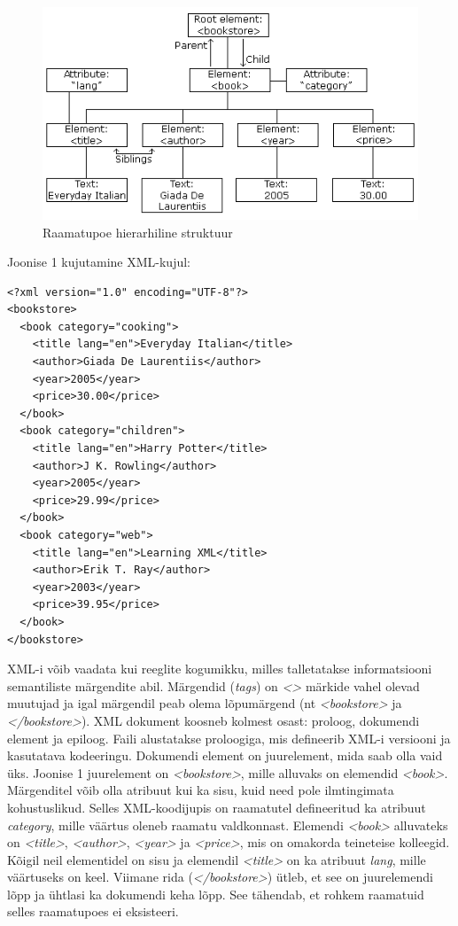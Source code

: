 \documentclass[12pt]{article}
\begin{document}
\begin{figure}[h]
\centering
\includegraphics[width=\textwidth]{figures/nodetree}
\caption{Raamatupoe hierarhiline struktuur \citep{XML}}
\end{figure}

Joonise 1 kujutamine XML-kujul:


\begin{lstlisting}
<?xml version="1.0" encoding="UTF-8"?>
<bookstore>
  <book category="cooking">
    <title lang="en">Everyday Italian</title>
    <author>Giada De Laurentiis</author>
    <year>2005</year>
    <price>30.00</price>
  </book>
  <book category="children">
    <title lang="en">Harry Potter</title>
    <author>J K. Rowling</author>
    <year>2005</year>
    <price>29.99</price>
  </book>
  <book category="web">
    <title lang="en">Learning XML</title>
    <author>Erik T. Ray</author>
    <year>2003</year>
    <price>39.95</price>
  </book>
</bookstore>
\end{lstlisting}
\citep{XML}

XML-i võib vaadata kui reeglite kogumikku, milles talletatakse informatsiooni semantiliste märgendite abil. Märgendid (\emph{tags}) on \emph{<>} märkide vahel olevad muutujad ja igal märgendil peab olema lõpumärgend (nt \emph{<bookstore>} ja \emph{</bookstore>}). XML dokument koosneb kolmest osast: proloog, dokumendi element ja epiloog. Faili alustatakse proloogiga, mis defineerib XML-i versiooni ja kasutatava kodeeringu. Dokumendi element on juurelement, mida saab olla vaid üks. Joonise 1 juurelement on \emph{<bookstore>}, mille alluvaks on elemendid \emph{<book>}. Märgenditel võib olla atribuut kui ka sisu, kuid need pole ilmtingimata kohustuslikud. Selles XML-koodijupis on raamatutel defineeritud ka atribuut \emph{category}, mille väärtus oleneb raamatu valdkonnast. Elemendi \emph{<book>} alluvateks on \emph{<title>}, \emph{<author>}, \emph{<year>} ja \emph{<price>}, mis on omakorda teineteise kolleegid. Kõigil neil elementidel on sisu ja elemendil \emph{<title>} on ka atribuut \emph{lang}, mille väärtuseks on keel. Viimane rida (\emph{</bookstore>}) ütleb, et see on juurelemendi lõpp ja ühtlasi ka dokumendi keha lõpp. See tähendab, et rohkem raamatuid selles raamatupoes ei eksisteeri. \citep{XML}
\end{document}
